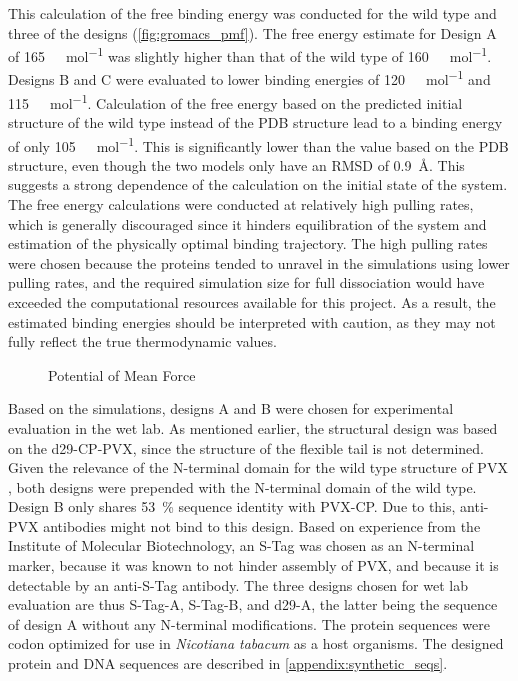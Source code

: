This calculation of the free binding energy was conducted for the wild type and three of the designs (\autoref{fig:gromacs_pmf}). The free energy estimate for Design A of \SI{165}{\kilo\cal\per\mole} was slightly higher than that of the wild type of \SI{160}{\kilo\cal\per\mole}. Designs B and C were evaluated to lower binding energies of \SI{120}{\kilo\cal\per\mole} and \SI{115}{\kilo\cal\per\mole}. Calculation of the free energy based on the predicted initial structure of the wild type instead of the PDB structure lead to a binding energy of only \SI{105}{\kilo\cal\per\mole}. This is significantly lower than the value based on the PDB structure, even though the two models only have an RMSD of \SI{0.9}{\angstrom}. This suggests a strong dependence of the calculation on the initial state of the system. The free energy calculations were conducted at relatively high pulling rates, which is generally discouraged since it hinders equilibration of the system and estimation of the physically optimal binding trajectory. The high pulling rates were chosen because the proteins tended to unravel in the simulations using lower pulling rates, and the required simulation size for full dissociation would have exceeded the computational resources available for this project. As a result, the estimated binding energies should be interpreted with caution, as they may not fully reflect the true thermodynamic values.

\begin{figure}
    
    \caption{Potential of Mean Force}
    \label{fig:gromacs_pmf}
\end{figure}

Based on the simulations, designs A and B were chosen for experimental evaluation in the wet lab. As mentioned earlier, the structural design was based on the d29-CP-PVX, since the structure of the flexible tail is not determined. Given the relevance of the N-terminal domain for the wild type structure of PVX \cite{del22_rigid}, both designs were prepended with the N-terminal domain of the wild type. Design B only shares \SI{53}{\percent} sequence identity with PVX-CP. Due to this, anti-PVX antibodies might not bind to this design. Based on experience from the Institute of Molecular Biotechnology, an S-Tag was chosen as an N-terminal marker, because it was known to not hinder assembly of PVX, and because it is detectable by an anti-S-Tag antibody. The three designs chosen for wet lab evaluation are thus S-Tag-A, S-Tag-B, and d29-A, the latter being the sequence of design A without any N-terminal modifications. The protein sequences were codon optimized for use in \emph{Nicotiana tabacum} as a host organisms. The designed protein and DNA sequences are described in \autoref{appendix:synthetic_seqs}.